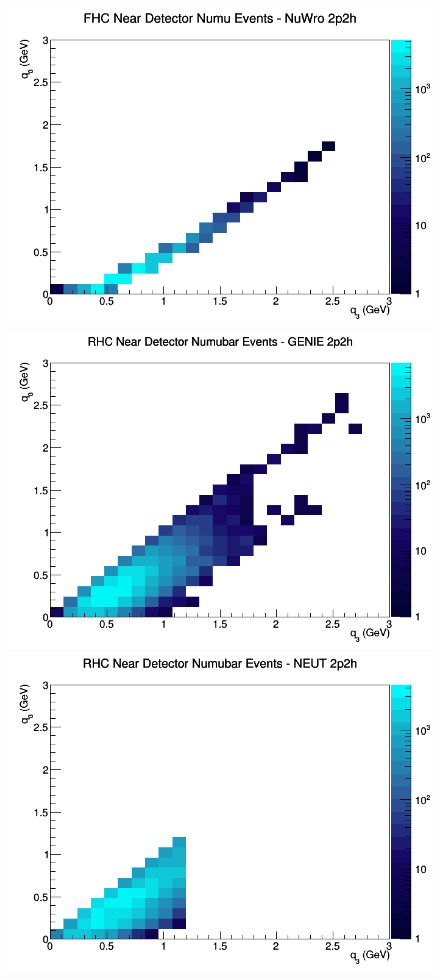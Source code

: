 \documentclass[12pt]{article}
\begin{document}
\begin{figure}[h]
\includegraphics[width=\linewidth]{q0_q3/nominal/2p2h_FHC_ND_numu_q3_q0_NuWro.png}
\endminipage
\newline
{}
\includegraphics[width=\linewidth]{q0_q3/nominal/2p2h_RHC_ND_numubar_q3_q0_GENIE.png}
\endminipage
{}
\includegraphics[width=\linewidth]{q0_q3/nominal/2p2h_RHC_ND_numubar_q3_q0_NEUT.png}

\end{figure}
\end{document}
